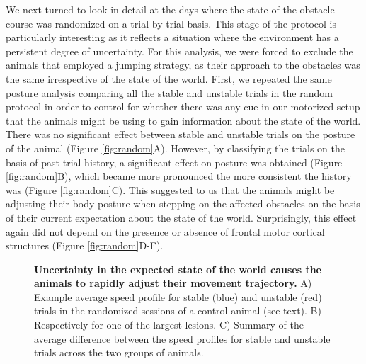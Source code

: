 We next turned to look in detail at the days where the state of the obstacle course was randomized on a trial-by-trial basis. This stage of the protocol is particularly interesting as it reflects a situation where the environment has a persistent degree of uncertainty. For this analysis, we were forced to exclude the animals that employed a jumping strategy, as their approach to the obstacles was the same irrespective of the state of the world. First, we repeated the same posture analysis comparing all the stable and unstable trials in the random protocol in order to control for whether there was any cue in our motorized setup that the animals might be using to gain information about the state of the world. There was no significant effect between stable and unstable trials on the posture of the animal (Figure \ref{fig:random}A). However, by classifying the trials on the basis of past trial history, a significant effect on posture was obtained (Figure \ref{fig:random}B), which became more pronounced the more consistent the history was (Figure \ref{fig:random}C). This suggested to us that the animals might be adjusting their body posture when stepping on the affected obstacles on the basis of their current expectation about the state of the world. Surprisingly, this effect again did not depend on the presence or absence of frontal motor cortical structures (Figure \ref{fig:random}D-F).

\begin{figure}
\centering

\caption{\textbf{Uncertainty in the expected state of the world causes the animals to rapidly adjust their movement trajectory.} A) Example average speed profile for stable (blue) and unstable (red) trials in the randomized sessions of a control animal (see text). B) Respectively for one of the largest lesions. C) Summary of the average difference between the speed profiles for stable and unstable trials across the two groups of animals.}
\label{fig:speed}
\end{figure}

